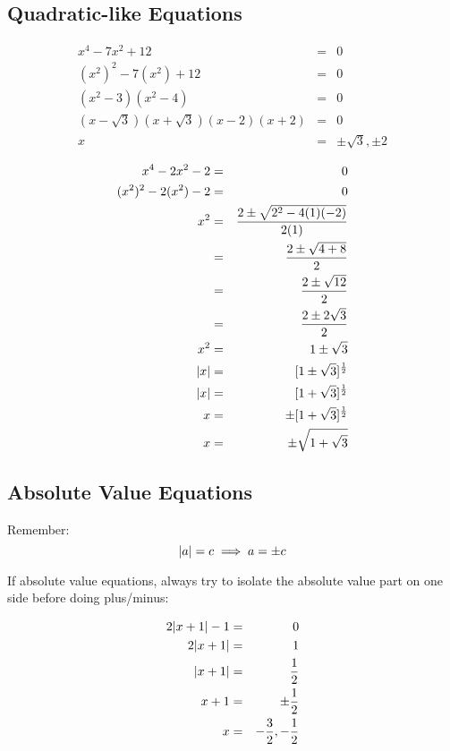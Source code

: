 \documentclass[letterpaper,12pt,fleqn]{article}
\begin{document}
\subsection*{Quadratic-like Equations}

\begin{eqnarray*}
  x^4-7x^2+12 &=& 0 \\
  (x^2)^2-7(x^2)+12 &=& 0 \\
  (x^2-3)(x^2-4) &=& 0 \\
  (x-\sqrt{3})(x+\sqrt{3})(x-2)(x+2) &=& 0 \\
  x &=& \pm\sqrt{3},\pm2 \\
\end{eqnarray*}
\begin{eqnarray*}
  x^4-2x^2-2 &=& 0 \\
  (x^2)^2-2(x^2)-2 &=& 0 \\
  x^2 &=& \frac{2\pm\sqrt{2^2-4(1)(-2)}}{2(1)} \\
  &=& \frac{2\pm\sqrt{4+8}}{2} \\
  &=& \frac{2\pm\sqrt{12}}{2} \\
  &=& \frac{2\pm2\sqrt{3}}{2} \\
  x^2 &=& 1\pm\sqrt{3} \\
  \lvert x\rvert &=& [1\pm\sqrt{3}]^{\frac{1}{2}} \\
  \lvert x\rvert &=& [1+\sqrt{3}]^{\frac{1}{2}} \\
  x &=& \pm[1+\sqrt{3}]^{\frac{1}{2}} \\
  x &=& \pm\sqrt{1+\sqrt{3}} \\
\end{eqnarray*}

\subsection*{Absolute Value Equations}

Remember:
\[\lvert a\rvert=c\implies a=\pm c\]

If absolute value equations, always try to isolate the absolute value part on
one side before doing plus/minus:

\begin{eqnarray*}
  2\lvert x+1\rvert-1 &=& 0 \\
  2\lvert x+1\rvert &=& 1 \\
  \lvert x+1\rvert &=& \frac{1}{2} \\
  x+1 &=& \pm\frac{1}{2} \\
  x &=& -\frac{3}{2},-\frac{1}{2} \\
\end{eqnarray*}
\end{document}
